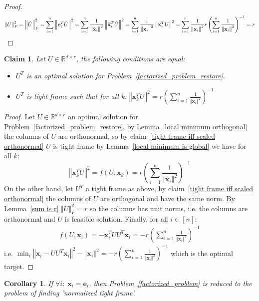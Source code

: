 \documentclass{article}
\newtheorem{corollary}{Corollary}
\newtheorem{claim}{Claim}
\newcommand{\probref}[1]{Problem~\ref{#1}}
\newcommand{\claimref}[1]{claim~\ref{#1}}
\newcommand{\Lemmaref}[1]{Lemma~\ref{#1}}
\newcommand{\x}{{\mathbf x}}
\newcommand{\e}{{\mathbf e}}
\newcommand{\norm}[1]{\left\Vert #1\right\Vert}
\begin{document}
\begin{proof}
$$
\left\Vert U\right\Vert_F^2=\left\Vert \hat{U}\right\Vert_F^2=\sum_{i=1}^n\norm{\e_i^T\hat{U}}^2=\sum_{i=1}^n\frac{1}{\norm{\Tilde{\x}_i}^2}\norm{\Tilde{\x}_i^T\hat{U}}^2=\sum_{i=1}^n\frac{1}{\norm{{\x}_i}^2}\norm{{\x}_i^T{U}}^2=\sum_{i=1}^n\frac{1}{\norm{{\x}_i}^2}r\left({\sum_{i=1}^n \frac{1}{\left\Vert \x_{i}\right\Vert^{2}}}\right)^{-1}=r
$$
\end{proof}

\begin{claim} \label{tight frame iff optimal solution}
Let $U\in\mathbb{R}^{d\times r}$, the following conditions are equal:
\begin{itemize}
    \item $U^T$ is an optimal solution for \probref{factorized_problem_restore}.
    \item $U^T$ is tight frame such that for all k: $\left\Vert \x_k^TU\right\Vert^2=r\left({\sum_{i=1}^n \frac{1}{\left\Vert \x_{i}\right\Vert^{2}}}\right)^{-1}$
\end{itemize}

\end{claim}
\begin{proof}

Let $U\in\mathbb{R}^{d\times r}$ an optimal solution for \probref{factorized_problem_restore}, by \Lemmaref{local minimum orthogonal} the columns of $U$ are orthonormal, so by \claimref{tight frame iff scaled orthonormal} $U$ is tight frame by \Lemmaref{local minimum is global} we have for all $k$:
$$
\norm{\x_k^TU}^2=f(U,\x_k)=r\left({\sum_{i=1}^n \frac{1}{\left\Vert \x_{i}\right\Vert^{2}}}\right)^{-1}
$$
On the other hand, let $U^T$ a tight frame as above, by \claimref{tight frame iff scaled orthonormal} the columns of $U$ are orthogonal and have the same norm. By \Lemmaref{sum is r} $\norm{U}_F^2=r$ so the columns has unit norms, i.e. the columns are orthonormal and $U$ is feasible solution. Finally, for all $i\in[n]$:
\begin{align*}
    f(U,\x_i)
    =-\x_{i}^TUU^T\x_{i}
    =-r\left({\sum_{i=1}^n \frac{1}{\left\Vert \x_{i}\right\Vert^{2}}}\right)^{-1}
\end{align*}
i.e. $\min_i\left\Vert \x_i-UU^T\x_i\right\Vert^2-\left\Vert \x_{i}\right\Vert^{2}=-r\left({\sum_{i=1}^n \frac{1}{\left\Vert \x_{i}\right\Vert^{2}}}\right)^{-1}$ which is the optimal target.
\end{proof}

\begin{corollary}
If $\forall i:\; \x_i=\e_i$, then \probref{factorized_problem} is reduced to the problem of finding 'normalized tight frame'.
\end{corollary}
\end{document}

